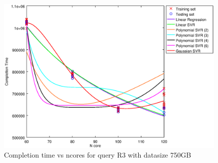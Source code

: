 
\begin {figure}[hbtp]
\centering
\includegraphics[width=\textwidth]{output/R3_750_ONLY_1_OVER_NCORES/plot_R3_750.eps}
\caption{Completion time vs ncores for query R3 with datasize 750GB}
\label{fig:all_nonlinear_R3_750}
\end {figure}
